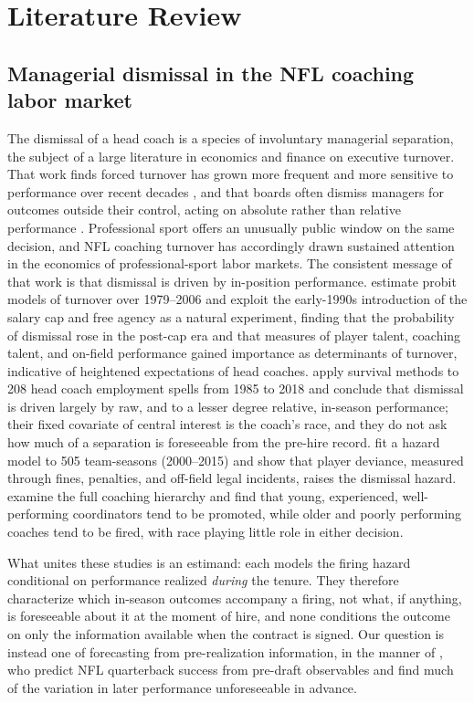 \documentclass[12pt,USenglish]{article}
\begin{document}
\section{Literature Review}
\label{sec:litreview}

\subsection{Managerial dismissal in the NFL coaching labor market}

The dismissal of a head coach is a species of involuntary managerial separation, the subject of a large literature in economics and finance on executive turnover. That work finds forced turnover has grown more frequent and more sensitive to performance over recent decades \citep{kaplanminton2012}, and that boards often dismiss managers for outcomes outside their control, acting on absolute rather than relative performance \citep{jenterkanaan2015}. Professional sport offers an unusually public window on the same decision, and NFL coaching turnover has accordingly drawn sustained attention in the economics of professional-sport labor markets. The consistent message of that work is that dismissal is driven by in-position performance. \citet{allen2012} estimate probit models of turnover over 1979--2006 and exploit the early-1990s introduction of the salary cap and free agency as a natural experiment, finding that the probability of dismissal rose in the post-cap era and that measures of player talent, coaching talent, and on-field performance gained importance as determinants of turnover, indicative of heightened expectations of head coaches. \citet{salaga2020} apply survival methods to 208 head coach employment spells from 1985 to 2018 and conclude that dismissal is driven largely by raw, and to a lesser degree relative, in-season performance; their fixed covariate of central interest is the coach's race, and they do not ask how much of a separation is foreseeable from the pre-hire record. \citet{foreman2019} fit a hazard model to 505 team-seasons (2000--2015) and show that player deviance, measured through fines, penalties, and off-field legal incidents, raises the dismissal hazard. \citet{farnell2021} examine the full coaching hierarchy and find that young, experienced, well-performing coordinators tend to be promoted, while older and poorly performing coaches tend to be fired, with race playing little role in either decision.

What unites these studies is an estimand: each models the firing hazard conditional on performance realized \emph{during} the tenure. They therefore characterize which in-season outcomes accompany a firing, not what, if anything, is foreseeable about it at the moment of hire, and none conditions the outcome on only the information available when the contract is signed. Our question is instead one of forecasting from pre-realization information, in the manner of \citet{wolfson2011}, who predict NFL quarterback success from pre-draft observables and find much of the variation in later performance unforeseeable in advance.
\end{document}
